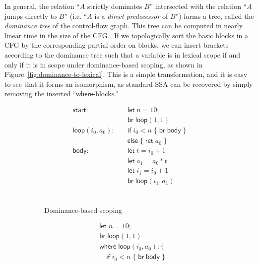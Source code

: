 \documentclass[acmsmall,screen,review]{acmart}
\newcommand{\ms}[1]{\ensuremath{\mathsf{#1}}}
\begin{document}
In general, the relation ``$A$ strictly dominates $B$'' intersected with the relation ``$A$ jumps
directly to $B$'' (i.e. ``$A$ is a \textit{direct predecessor} of $B$'') forms a tree, called the
\textit{dominance tree} of the control-flow graph. This tree can be computed in nearly linear time
in the size of the CFG \cite{ssa-intro}. If we topologically sort the basic blocks in a CFG by the
corresponding partial order on blocks, we can insert brackets according to the dominance tree such
that a variable is in lexical scope if and only if it is in scope under dominance-based scoping, as
shown in Figure~\ref{fig:dominance-to-lexical}. This is a simple transformation, and it is easy to
see that it forms an isomorphism, as standard SSA can be recovered by simply removing the inserted
``\ms{where}-blocks."

\begin{figure}
  \centering
  \begin{subfigure}[t]{.5\textwidth}
    \begin{align*}
      \ms{start}:\quad            & \ms{let}\;n = 10; \\
                                  & \ms{br}\;\ms{loop}(1, 1) \\
      \ms{loop}(i_0, a_0): \quad  & \ms{if}\;i_0 < n\; \{\;\ms{br}\;\ms{body}\;\} \\
                                  & \ms{else}\;\{\;\ms{ret}\;a_0\;\} \\
      \ms{body}: \quad            & \ms{let}\;t = i_0 + 1 \\
                                  & \ms{let}\;a_1 = a_0 * t \\
                                  & \ms{let}\;i_1 = i_0 + 1 \\
                                  & \ms{br}\;\ms{loop}(i_1, a_1) \\ \\ \\ \\ 
    \end{align*}
    \caption{Dominance-based scoping}
  \end{subfigure}%
  \begin{subfigure}[t]{.5\textwidth}
    \begin{align*}
      & \ms{let}\;n = 10; \\
      & \ms{br}\;\ms{loop}(1, 1) \\
      & \ms{where}\;\ms{loop}(i_0, a_0): \{ \\
      & \quad \ms{if}\;i_0 < n\;\{\;\ms{br}\;\ms{body}\;\} \\

\end{align*}
\end{subfigure}
\end{figure}
\end{document}
